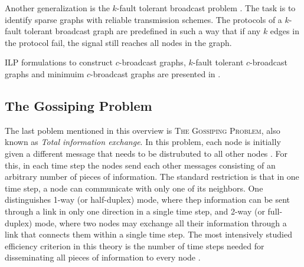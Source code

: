 Another generalization is the $k$-fault tolerant broadcast problem \cite{liestman85}.
The task is to identify sparse graphs with reliable transmission schemes.
The protocols of a $k$-fault tolerant broadcast graph are predefined in such a way that if any $k$ edges in the protocol fail, the signal still reaches all nodes in the graph.

ILP formulations to construct $c$-broadcast graphs, $k$-fault tolerant $c$-broadcast graphs and minimuim $c$-broadcast graphs are presented in \cite{mcgarvey16}.

\subsection{The Gossiping Problem}

The last poblem mentioned in this overview is \textsc{The Gossiping Problem}, also known as \emph{Total information exchange}.
In this problem, each node is initially given a different message that needs to be distrubuted to all other nodes \cite{chrobak00}.
For this, in each time step the nodes send each other messages consisting of an arbitrary number of pieces of information. 
The standard restriction is that in one time step, a node can communicate with only one of its neighbors. 
One distinguishes 1-way (or half-duplex) mode, where thep information can be sent through a link in only one direction in a single time step, 
and 2-way (or full-duplex) mode, where two nodes may exchange all their information through a link that connects them within a single time step. 
The most intensively studied efficiency criterion in this theory is the number of time steps needed for disseminating all pieces of information to every node \cite{dietzfelbinger04}.
